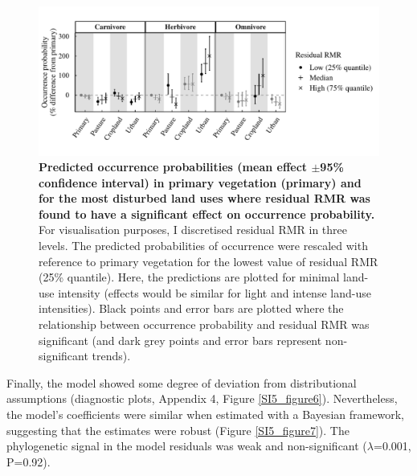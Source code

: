 \begin{figure}[h!]
\centering
\includegraphics[scale=0.65]{figures/Chapter5/Minor_corrections/Figure_Occurrence_probability}
\caption[Predicted occurrence probabilities in primary vegetation and for the most disturbed land uses where residual RMR was found to have a significant effect on occurrence probability]{\textbf{Predicted occurrence probabilities (mean effect $\pm$95\% confidence interval) in primary vegetation (primary) and for the most disturbed land uses where residual RMR was found to have a significant effect on occurrence probability.} For visualisation purposes, I discretised residual RMR in three levels. The predicted probabilities of occurrence were rescaled with reference to primary vegetation for the lowest value of residual RMR (25\% quantile). Here, the predictions are plotted for minimal land-use intensity (effects would be similar for light and intense land-use intensities). Black points and error bars are plotted where the relationship between occurrence probability and residual RMR was significant (and dark grey points and error bars represent non-significant trends).}
\label{chap5_fig5}
\end{figure}

Finally, the model showed some degree of deviation from distributional assumptions (diagnostic plots, Appendix 4, Figure \ref{SI5_figure6}). Nevertheless, the model's coefficients were similar when estimated with a Bayesian framework, suggesting that the estimates were robust (Figure \ref{SI5_figure7}). The phylogenetic signal in the model residuals was weak and non-significant ($\lambda$=0.001, P=0.92). %


